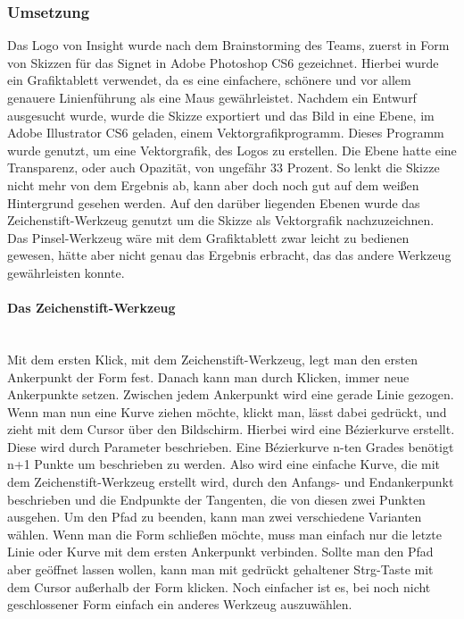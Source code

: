 \subsubsection{Umsetzung}
Das Logo von Insight wurde nach dem Brainstorming des Teams, zuerst in Form von Skizzen für das Signet in Adobe Photoshop CS6 gezeichnet. Hierbei wurde ein Grafiktablett verwendet, da es eine einfachere, schönere und vor allem genauere Linienführung als eine Maus gewährleistet.
Nachdem ein Entwurf ausgesucht wurde, wurde die Skizze exportiert und das Bild in eine Ebene, im Adobe Illustrator CS6 geladen, einem Vektorgrafikprogramm. Dieses Programm wurde genutzt, um eine Vektorgrafik, des Logos zu erstellen. Die Ebene hatte eine Transparenz, oder auch Opazität, von ungefähr 33 Prozent. So lenkt die Skizze nicht mehr von dem Ergebnis ab, kann aber doch noch gut auf dem weißen Hintergrund gesehen werden. Auf den darüber liegenden Ebenen wurde das Zeichenstift-Werkzeug genutzt um die Skizze als Vektorgrafik nachzuzeichnen. Das Pinsel-Werkzeug wäre mit dem Grafiktablett zwar leicht zu bedienen gewesen, hätte aber nicht genau das Ergebnis erbracht, das das andere Werkzeug gewährleisten konnte.
\leavevmode \\

\paragraph{Das Zeichenstift-Werkzeug}
\leavevmode \\
Mit dem ersten Klick, mit dem Zeichenstift-Werkzeug, legt man den ersten Ankerpunkt der Form fest. Danach kann man durch Klicken, immer neue Ankerpunkte setzen. Zwischen jedem Ankerpunkt wird eine gerade Linie gezogen. Wenn man nun eine Kurve ziehen möchte, klickt man, lässt dabei gedrückt, und zieht mit dem Cursor über den Bildschirm. Hierbei wird eine Bézierkurve erstellt. Diese wird durch Parameter beschrieben. Eine Bézierkurve n-ten Grades benötigt n+1 Punkte um beschrieben zu werden. Also wird eine einfache Kurve, die mit dem Zeichenstift-Werkzeug erstellt wird, durch den Anfangs- und Endankerpunkt beschrieben und die Endpunkte der Tangenten, die von diesen zwei Punkten ausgehen. Um den Pfad zu beenden, kann man zwei verschiedene Varianten wählen. Wenn man die Form schließen möchte, muss man einfach nur die letzte Linie oder Kurve mit dem ersten Ankerpunkt verbinden. Sollte man den Pfad aber geöffnet lassen wollen, kann man mit gedrückt gehaltener Strg-Taste mit dem Cursor außerhalb der Form klicken. Noch einfacher ist es, bei noch nicht geschlossener Form einfach ein anderes Werkzeug auszuwählen.\cite{stift}\cite{bezier}
\leavevmode \\

